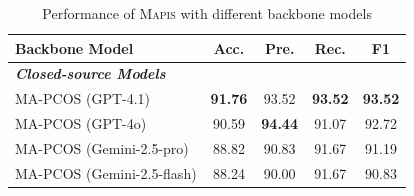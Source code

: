 \begin{table}[!t]
\centering
\caption{Performance of \textsc{Mapis} with different backbone models}
\label{tab:backbone_comparison}
\begin{tabular}{@{}lcccc@{}}
\toprule
\textbf{Backbone Model} & \textbf{Acc.} & \textbf{Pre.} & \textbf{Rec.} & \textbf{F1} \\
\midrule
\multicolumn{5}{l}{\textit{\textbf{Closed-source Models}}} \\
MA-PCOS (GPT-4.1) & \textbf{91.76} & 93.52 & \textbf{93.52} & \textbf{93.52} \\
MA-PCOS (GPT-4o) & 90.59 & \textbf{94.44} & 91.07 & 92.72 \\
MA-PCOS (Gemini-2.5-pro) & 88.82 & 90.83 & 91.67 & 91.19 \\
MA-PCOS (Gemini-2.5-flash) & 88.24 & 90.00 & 91.67 & 90.83 \\
\bottomrule
\end{tabular}
\end{table}

